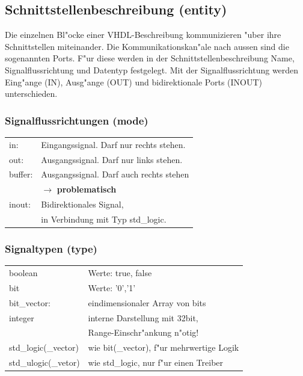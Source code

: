 \subsection{Schnittstellenbeschreibung (entity)}
	Die einzelnen Bl"ocke einer VHDL-Beschreibung kommunizieren "uber ihre 
	Schnittstellen miteinander. Die Kommunikationskan"ale nach aussen sind die sogenannten Ports. F"ur diese werden in der Schnittstellenbeschreibung Name, Signalflussrichtung und Datentyp festgelegt. Mit der Signalflussrichtung werden Eing"ange (IN), Ausg"ange (OUT) und bidirektionale Ports (INOUT) unterschieden.
	\vspace{-\baselineskip}
	\begin{multicols}{2}
		
		
	\end{multicols}
\begin{multicols}{2}
\subsubsection{Signalflussrichtungen (mode)}
	\begin{tabular}{ll}
		in: & Eingangssignal. Darf nur rechts stehen.\\
		out: & Ausgangssignal. Darf nur links stehen.\\
		buffer: & Ausgangssignal. Darf auch rechts stehen\\
		&  $\rightarrow$ \textbf{problematisch}\\
		inout: & Bidirektionales Signal, \\
		& in Verbindung mit Typ std\_logic.\\
	\end{tabular}
\vfill\null
\subsubsection{Signaltypen (type)}
	\begin{tabular}{ll}
		boolean & Werte: true, false\\
		bit & Werte: '0','1'\\
		bit\_vector: & eindimensionaler Array von bits\\
		integer & interne Darstellung mit 32bit,\\
		& Range-Einschr"ankung n"otig!\\
		std\_logic(\_vector) & wie bit(\_vector), f"ur mehrwertige Logik\\
		std\_ulogic(\_vetor) & wie std\_logic, nur f"ur einen Treiber\\
	\end{tabular}
\end{multicols}
	
